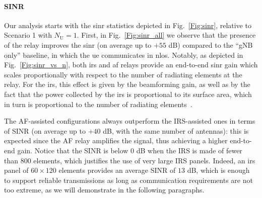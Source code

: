 \paragraph{SINR} Our analysis starts with the \gls{sinr} statistics depicted in Fig.~\ref{Fig:sinr}, relative to Scenario 1 with $N_{\mathrm U}=1$.
First, in Fig.~\ref{Fig:sinr_all} we observe that the presence of the relay improves the \gls{sinr} (on average up to $+55$ dB) compared to the ``gNB only'' baseline, in which the \gls{ue} communicates in \gls{nlos}. %
Notably, as depicted in Fig.~\ref{Fig:sinr_vs_n}, both \gls{irs} and \gls{af} relays provide an end-to-end \gls{sinr} gain which scales proportionally 
with respect to the number of radiating elements at the relay. %
For the \gls{irs}, this effect is given by the beamforming gain, as well as by the fact that the power collected by the \gls{irs} is proportional to its surface area, which in turn is proportional to the number of radiating elements~\cite{bjornson2020reconfigurable}.

The AF-assisted configurations always outperform the IRS-assisted ones in terms of SINR (on average up to $+40$ dB, with the same number of antennas): this is expected since the AF relay amplifies the signal, thus achieving a higher end-to-end gain. 
Notice that the SINR is below 0 dB when the IRS is made of fewer than $800$ elements, which justifies the use of very large IRS panels. 
Indeed, an \gls{irs} panel of $60\times120$ elements provides an average SINR of $13$ dB, which is enough to support reliable transmissions as long as communication requirements are not too extreme, as we will demonstrate in the following paragraphs. 

